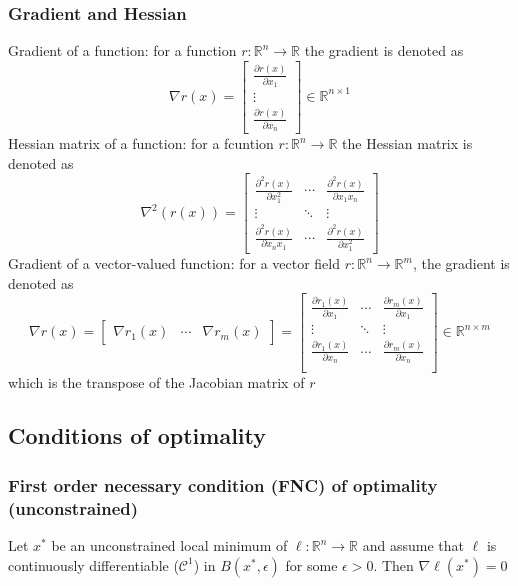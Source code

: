 \documentclass{book}
\newcommand{\R}{\mathbb{R}}
\begin{document}
\subsubsection{Gradient and Hessian}
Gradient of a function: for a function $r:\R^n\to\R$  the gradient is denoted as 
\[
    \nabla r(x) = \begin{bmatrix}
         \displaystyle\frac{\partial r(x)}{\partial x_1} \\ \vdots \\ \displaystyle\frac{\partial r(x)}{\partial x_n}
     \end{bmatrix} \in \R^{n\times 1}
\]
Hessian matrix of a function: for a fcuntion $r:\R^n\to\R$  the Hessian matrix is denoted as 
\[
    \nabla^2(r(x)) = \begin{bmatrix}
        \displaystyle\frac{\partial^2 r(x)}{\partial x_1^2} & \cdots & \displaystyle\frac{\partial^2 r(x)}{\partial x_1x_n} \\ \vdots & \ddots & \vdots \\ \displaystyle\frac{\partial^2 r(x)}{\partial x_nx_1} & \cdots & \displaystyle\frac{\partial^2 r(x)}{\partial x_1^2}
    \end{bmatrix}
\]
Gradient of a vector-valued function: for a vector field $r:\R^n\to\R^m$, the gradient is denoted as 
\[
    \nabla r(x) = \begin{bmatrix}
        \nabla r_1(x) & \cdots & \nabla r_m(x)
    \end{bmatrix} = \begin{bmatrix}
        \displaystyle\frac{\partial r_1(x)}{\partial x_1} & \cdots & \displaystyle\frac{\partial r_m(x)}{\partial x_1} \\
        \vdots & \ddots & \vdots \\
        \displaystyle\frac{\partial r_1(x)}{\partial x_n} & \cdots & \displaystyle\frac{\partial r_m(x)}{\partial x_n} \\
    \end{bmatrix} \in \R^{n\times m}
\]
which is the transpose of the Jacobian matrix of $r$
\subsection{Conditions of optimality}
\subsubsection{First order necessary condition (FNC) of optimality (unconstrained)}
Let $x^*$ be an unconstrained local minimum of $\ell:\R^n\to\R$ and assume that $\ell$ is continuously differentiable ($\mathcal{C}^1$) in $B(x^*,\epsilon)$ for some $\epsilon>0$. Then $\nabla \ell(x^*)=0$
\end{document}
